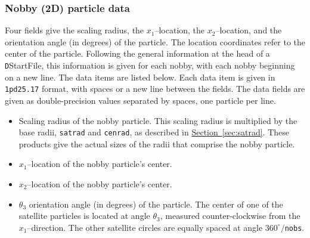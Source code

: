 \documentclass[letterpaper,11pt]{article}
\begin{document}
\subsubsection{Nobby (2D) particle data}\label{sec:nobby_data}
Four fields give the scaling radius, 
the $x_{1}$--location, the $x_{2}$--location, and the orientation
angle (in degrees) of the particle.
The location coordinates refer to the center of the particle.
Following the general information at the head of a
\texttt{D}\textsf{StartFile}, this
information is given for each nobby,
with each nobby beginning on a new line.
The data items are listed below.
Each data item is given in \texttt{1pd25.17} format, with
spaces or a new line between the fields.
The data fields are given as double-precision values
separated by spaces, one particle per line.
%
\begin{itemize}
\item
Scaling radius of the nobby particle.
This scaling radius is multiplied by the base radii,
\texttt{satrad} and \texttt{cenrad}, as described
in \hyperref[sec:satrad]{Section~\ref*{sec:satrad}}.
These products give the actual sizes of the radii that comprise
the nobby particle.
\item
$x_{1}$--location of the nobby particle's center.
\item
$x_{2}$--location of the nobby particle's center.
\item
$\theta_{3}$ orientation angle (in degrees) of the particle.
The center of one of the satellite particles is located at
angle $\theta_{3}$, measured counter-clockwise from the $x_{1}$--direction.
The other satellite circles are equally spaced at angle
\mbox{$360^{\circ}/$\texttt{nobs}}.
\end{itemize}
%
%
\end{document}
